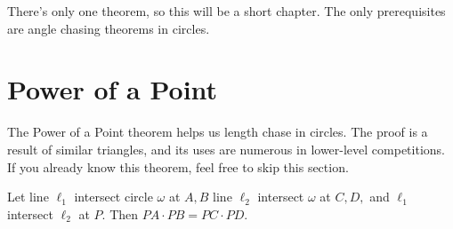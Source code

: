 
There's only one theorem, so this will be a short chapter. The only prerequisites are angle chasing theorems in circles.

\section{Power of a Point}

The Power of a Point theorem helps us length chase in circles. The proof is a result of similar triangles, and its uses are numerous in lower-level competitions. If you already know this theorem, feel free to skip this section.

\begin{theo}
Let line $\ell_1$ intersect circle $\omega$ at $A,B$ line $\ell_2$ intersect $\omega$ at $C,D,$ and $\ell_1$ intersect $\ell_2$ at $P.$ Then $PA\cdot PB=PC\cdot PD.$
\end{theo}

